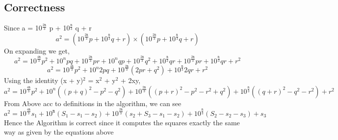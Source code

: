 \documentclass{report}
\begin{document}
 \subsection*{Correctness}
 Since a = 10$^{\frac{2\mathtt{n}}{3}}$ p + 10$^{\frac{\mathtt{n}}{3}}$ q + r\\
 \begin{equation*}
     a^2 = (10^{\frac{2\mathtt{n}}{3}} p + 10^{\frac{\mathtt{n}}{3}} q + r) \times (10^{\frac{2\mathtt{n}}{3}} p + 10^{\frac{\mathtt{n}}{3}} q + r)
 \end{equation*}
 On expanding we get,\\
 \begin{equation*}
     a^2 = 10^{\frac{4\mathtt{n}}{3}} p^2 + 10^{n} pq + 10^{\frac{2\mathtt{n}}{3}} pr + 10^{n} qp + 10^{\frac{2\mathtt{n}}{3}} q^2 + 10^{\frac{\mathtt{n}}{3}} qr +
     10^{\frac{2\mathtt{n}}{3}} pr + 10^{\frac{\mathtt{n}}{3}} qr + r^2
 \end{equation*}
 \begin{equation*}
     a^2 = 10^{\frac{4\mathtt{n}}{3}} p^2 + 10^{n} 2pq + 10^{\frac{2\mathtt{n}}{3}} (2pr + q^2) + 10^{\frac{\mathtt{n}}{3}} 2qr + r^2
 \end{equation*}
 Using the identity (x + y)$^2$  = x$^2$ + y$^2$ + 2xy,\\
 \begin{equation*}
     a^2 = 10^{\frac{4\mathtt{n}}{3}} p^2 + 10^{n}( (p+q)^2 - p^2 - q^2) + 10^{\frac{2\mathtt{n}}{3}} ((p+r)^2 - p^2 - r^2 + q^2) + 10^{\frac{\mathtt{n}}{3}} ((q+r)^2 - q^2 - r^2) + r^2
 \end{equation*}
 From Above acc to definitions in the algorithm, we can see
 \begin{equation*}
     a^2 = 10^{\frac{4\mathtt{n}}{3}} s_1 + 10^{\mathtt{n}} (S_1 - s_1 -s_2) + 10^{\frac{2\mathtt{n}}{3}} (s_2 + S_3 - s_1 - s_2) + 10^{\frac{\mathtt{n}}{3}} (S_2 - s_2 - s_3) + s_3
 \end{equation*}
 Hence the Algorithm is correct since it computes the squares exactly the same way as given by the equations above\\
\end{document}
